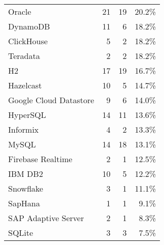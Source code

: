 \begin{tabular}{lrrr}
                  Oracle &                          21 &          19 &       20.2\% \\
                DynamoDB &                          11 &           6 &       18.2\% \\
              ClickHouse &                           5 &           2 &       18.2\% \\
                Teradata &                           2 &           2 &       18.2\% \\
                      H2 &                          17 &          19 &       16.7\% \\
               Hazelcast &                          10 &           5 &       14.7\% \\
  Google Cloud Datastore &                           9 &           6 &       14.0\% \\
                HyperSQL &                          14 &          11 &       13.6\% \\
                Informix &                           4 &           2 &       13.3\% \\
                   MySQL &                          14 &          18 &       13.1\% \\
       Firebase Realtime &                           2 &           1 &       12.5\% \\
                 IBM DB2 &                          10 &           5 &       12.2\% \\
               Snowflake &                           3 &           1 &       11.1\% \\
                 SapHana &                           1 &           1 &        9.1\% \\
     SAP Adaptive Server &                           2 &           1 &        8.3\% \\
                  SQLite &                           3 &           3 &        7.5\% \\
\hline
\end{tabular}
